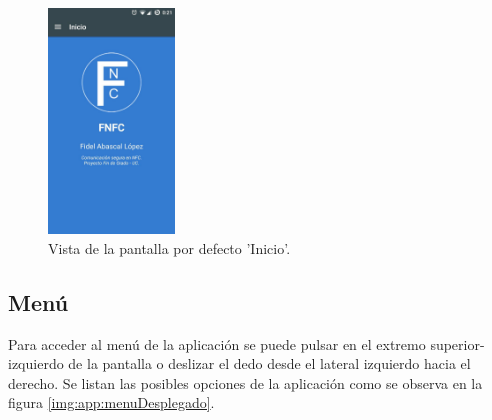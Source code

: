\documentclass[../PFC.tex]{subfiles}
\begin{document}
\begin{figure}[H]
  \centering
  \includegraphics[width=0.3\textwidth]{./img/app/pantallaPrincipal}
  \caption{Vista de la pantalla por defecto 'Inicio'.}
  \label{img:app:inicio}
\end{figure}

\subsection{Menú}
\label{App:Menu}

Para acceder al menú de la aplicación se puede pulsar en el extremo superior-izquierdo de la pantalla o deslizar el dedo desde el lateral izquierdo hacia el derecho. Se listan las posibles opciones de la aplicación como se observa en la figura \ref{img:app:menuDesplegado}.
\end{document}
